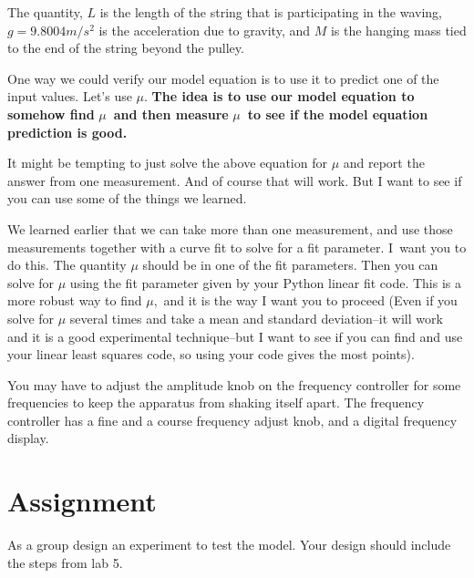 \documentclass{book}
\begin{document}
The quantity, $L$ is the length of the string that is participating in the
waving, $g=9.8004\unit{m}/\unit{s}^2$ is the acceleration due to gravity, and $M$ is the hanging mass tied to
the end of the string beyond the pulley.

One way we could verify our model equation is to use it to predict one of the
input values. Let's use $\mu$. \textbf{The idea is to use our model equation
to somehow find }$\mu$\textbf{\ and then measure }$\mu$\textbf{\ to see if the
model equation prediction is good.}

It might be tempting to just solve the above equation for $\mu$ and report the
answer from one measurement. And of course that will work. But I want to see if you can use some of the things we learned.

We learned earlier that we can take more than one measurement, and use those
measurements together with a curve fit to solve for a fit parameter. I\ want
you to do this. The quantity $\mu$ should be in one of the fit parameters.
Then you can solve for $\mu$ using the fit parameter given by your Python
linear fit code. This is a more robust way to find $\mu,$ and it is the way I want you to proceed (Even
if you solve for $\mu$ several times and take a mean and standard
deviation--it will work and it is a good experimental technique--but I want to
see if you can find and use your linear least squares code, so using your code
gives the most points).

You may have to adjust the amplitude knob on the frequency controller for some
frequencies to keep the apparatus from shaking itself apart. The frequency
controller has a fine and a course frequency adjust knob, and a digital
frequency display.

\section{Assignment}

As a group design an experiment to test the model. Your design should
include the steps from lab 5.
\end{document}
